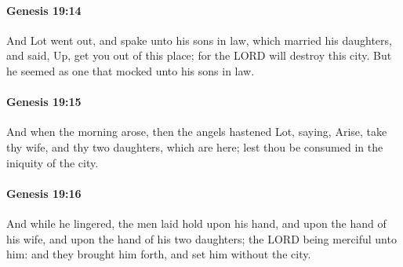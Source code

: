 		\paragraph{Genesis 19:14} %
			\label{GENESIS-19-14}

			And Lot went out, and spake unto his sons in law, which married his daughters, and said, Up, get you out of this place; for the LORD will destroy this city.  But he seemed as one that mocked unto his sons in law.


		\paragraph{Genesis 19:15} %
			\label{GENESIS-19-15}

			And when the morning arose, then the angels hastened Lot, saying, Arise, take thy wife, and thy two daughters, which are here; lest thou be consumed in the iniquity of the city.


		\paragraph{Genesis 19:16} %
			\label{GENESIS-19-16}

			And while he lingered, the men laid hold upon his hand, and upon the hand of his wife, and upon the hand of his two daughters; the LORD being merciful unto him: and they brought him forth, and set him without the city.

